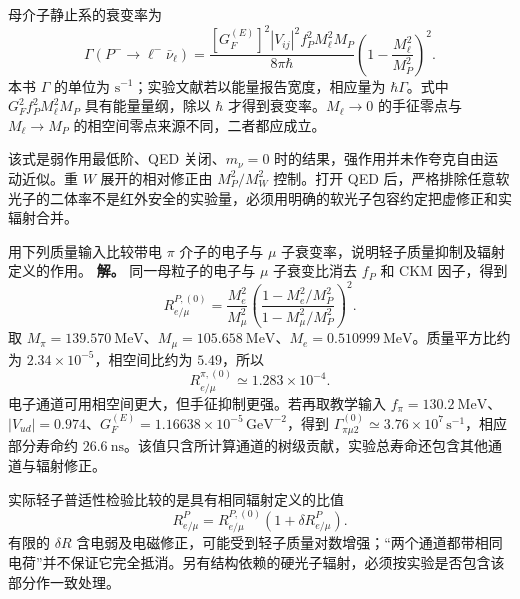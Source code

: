 母介子静止系的衰变率为
\begin{equation}
 \Gamma(P^-\to\ell^-\bar\nu_\ell)
 =\frac{[G_F^{(E)}]^2|V_{ij}|^2f_P^2M_\ell^2M_P}{8\pi\hbar}
 \left(1-\frac{M_\ell^2}{M_P^2}\right)^2.
 \label{eq:sm-pseudoscalar-width}
\end{equation}
本书 $\Gamma$ 的单位为 $\mathrm{s^{-1}}$；实验文献若以能量报告宽度，相应量为 $\hbar\Gamma$。式中 $G_F^2f_P^2M_\ell^2M_P$ 具有能量量纲，除以 $\hbar$ 才得到衰变率。$M_\ell\to0$ 的手征零点与 $M_\ell\to M_P$ 的相空间零点来源不同，二者都应成立。

该式是弱作用最低阶、QED 关闭、$m_\nu=0$ 时的结果，强作用并未作夸克自由运动近似。重 $W$ 展开的相对修正由 $M_P^2/M_W^2$ 控制。打开 QED 后，严格排除任意软光子的二体率不是红外安全的实验量，必须用明确的软光子包容约定把虚修正和实辐射合并。

\begin{exbox}[带电 $\pi$ 介子的轻子衰变比]
用下列质量输入比较带电 $\pi$ 介子的电子与 $\mu$ 子衰变率，说明轻子质量抑制及辐射定义的作用。
\textbf{解。} 同一母粒子的电子与 $\mu$ 子衰变比消去 $f_P$ 和 CKM 因子，得到
\begin{equation}
 R_{e/\mu}^{P,(0)}
 =\frac{M_e^2}{M_\mu^2}
 \left(\frac{1-M_e^2/M_P^2}{1-M_\mu^2/M_P^2}\right)^2.
 \label{eq:sm-pseudoscalar-universality-ratio}
\end{equation}
取 $M_\pi=\SI{139.570}{\mega\electronvolt}$、$M_\mu=\SI{105.658}{\mega\electronvolt}$、$M_e=\SI{0.510999}{\mega\electronvolt}$。质量平方比约为 $2.34\times10^{-5}$，相空间比约为 $5.49$，所以
\begin{equation*}
 R_{e/\mu}^{\pi,(0)}\simeq1.283\times10^{-4}.
\end{equation*}
电子通道可用相空间更大，但手征抑制更强。若再取教学输入 $f_\pi=\SI{130.2}{\mega\electronvolt}$、$|V_{ud}|=0.974$、$G_F^{(E)}=1.16638\times10^{-5}\,\mathrm{GeV^{-2}}$，得到 $\Gamma_{\pi\mu2}^{(0)}\simeq3.76\times10^7\,\mathrm{s^{-1}}$，相应部分寿命约 $\SI{26.6}{\nano\second}$。该值只含所计算通道的树级贡献，实验总寿命还包含其他通道与辐射修正。

实际轻子普适性检验比较的是具有相同辐射定义的比值
\begin{equation*}
 R_{e/\mu}^{P}=R_{e/\mu}^{P,(0)}(1+\delta R_{e/\mu}^{P}).
\end{equation*}
有限的 $\delta R$ 含电弱及电磁修正，可能受到轻子质量对数增强；“两个通道都带相同电荷”并不保证它完全抵消。另有结构依赖的硬光子辐射，必须按实验是否包含该部分作一致处理。
\end{exbox}

